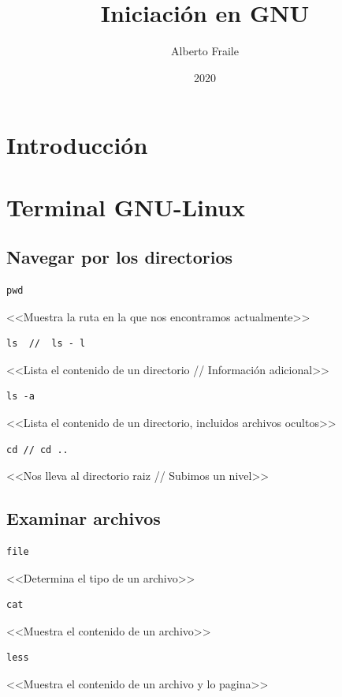 \documentclass[a4paper, 10pt, titlepage]{report}
\title{Iniciación en GNU}
\author{Alberto Fraile}
\date{2020}
\begin{document}
\maketitle
\tableofcontents
\newpage

\chapter*{Introducción}
\chapter{Terminal GNU-Linux}
\section{Navegar por los directorios} 
\begin{verbatim}
pwd
\end{verbatim}
<<Muestra la ruta en la que nos encontramos actualmente>>

\begin{verbatim}
ls  //  ls - l
\end{verbatim}
<<Lista el contenido de un directorio // Información adicional>>  

\begin{verbatim}
ls -a
\end{verbatim}
<<Lista el contenido de un directorio, incluidos archivos ocultos>>

\begin{verbatim}
cd // cd ..
\end{verbatim}
<<Nos lleva al directorio raiz // Subimos un nivel>> \


\section{Examinar archivos} 

\begin{verbatim}
file
\end{verbatim}
<<Determina el tipo de un archivo>>

\begin{verbatim}
cat
\end{verbatim}
<<Muestra el contenido de un archivo>>

\begin{verbatim}
less
\end{verbatim}
<<Muestra el contenido de un archivo y lo pagina>> \

\newpage
\end{document}
